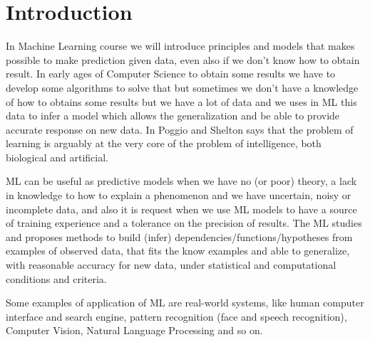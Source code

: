 \chapter{Introduction}
In Machine Learning course we will introduce principles and models that makes possible to make prediction
given data, even also if we don't know how to obtain result.\newline
In early ages of Computer Science to obtain some results we have to develop some algorithms to solve that 
but sometimes we don't have a knowledge of how to obtains some results but we have a lot of data and we 
uses in ML this data to infer a model which allows the generalization and be able to provide accurate response
on new data.\newline
In \cite{aiMagazine} Poggio and Shelton says that the problem of learning is arguably at the very core of 
the problem of intelligence, both biological and artificial.

ML can be useful as predictive models when we have no (or poor) theory, a lack in knowledge to how to explain
a phenomenon and we have uncertain, noisy or incomplete data, and also it is request when we use ML models 
to have a source of training experience and a tolerance on the precision of results.\newline
The ML studies and proposes methods to build (infer) dependencies/functions/hypotheses from examples
of observed data, that fits the know examples and able to generalize, with reasonable accuracy for new data,
under statistical and computational conditions and criteria.

Some examples of application of ML are real-world systems, like human computer interface and search engine,
pattern recognition (face and speech recognition), Computer Vision, Natural Language Processing and so on.

